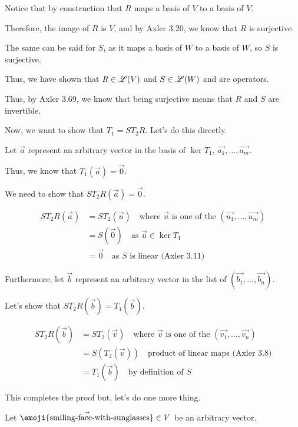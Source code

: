 \documentclass{report}
\newcommand{\memoji}[1]{\ifmmode \text{\emoji{#1}} \else \emoji{#1} \fi}
\begin{document}
{{		Notice that by construction that \(R\) maps a basis of \(V\) to a basis of \(V\).

		Therefore, the image of \(R\) is \(V\), and by Axler 3.20, we know that \(R\) is surjective.

		The same can be said for \(S\), as it maps a basis of \(W\) to a basis of \(W\), so \(S\) is surjective.

		Thus, we have shown that \(R \in {\mathscr{L}}(V)\) and \(S \in {\mathscr{L}}(W)\) and are operators.

		Thus, by Axler 3.69, we know that being surjective means that \(R\) and \(S\) are invertible.

		Now, we want to show that \(T_1 = ST_2R\). Let's do this directly.

		Let \(\vec{a}\) represent an arbitrary vector in the basis of \(\ker T_1\), \(\vec{a_1}, \ldots, \vec{a_m}\).

		Thus, we know that \(T_1(\vec{a}) = \vec{0}\).

		We need to show that \(ST_2R(\vec{a}) = \vec{0}\).

		\begin{align*}
			ST_2R(\vec{a}) & = ST_2(\vec{u}) \quad \text{where \(\vec{u}\) is one of the } (\vec{u_1}, \ldots, \vec{u_m}) \\
			               & = S(\vec{0}) \quad \text{as \(\vec{u} \in \ker T_1\)}                                        \\
			               & = \vec{0} \quad \text{as \(S\) is linear (Axler 3.11)}
		\end{align*}

		Furthermore, let \(\vec{b}\) represent an arbitrary vector in the list of \((\vec{b_1}, \ldots, \vec{b_n})\).

		Let's show that \(ST_2R(\vec{b}) = T_1(\vec{b})\).

		\begin{align*}
			ST_2R(\vec{b}) & = ST_2(\vec{v}) \quad \text{where \(\vec{v}\) is one of the } (\vec{v_1}, \ldots, \vec{v_n}) \\
			               & = S(T_2(\vec{v})) \quad \text{product of linear maps (Axler 3.8)}                            \\
			               & = T_1(\vec{b}) \quad \text{by definition of \(S\)}
		\end{align*}

		This completes the proof but, let's do one more thing.

		Let \(\vec{\memoji{smiling-face-with-sunglasses}} \in V\) be an arbitrary vector.

}}
\end{document}
